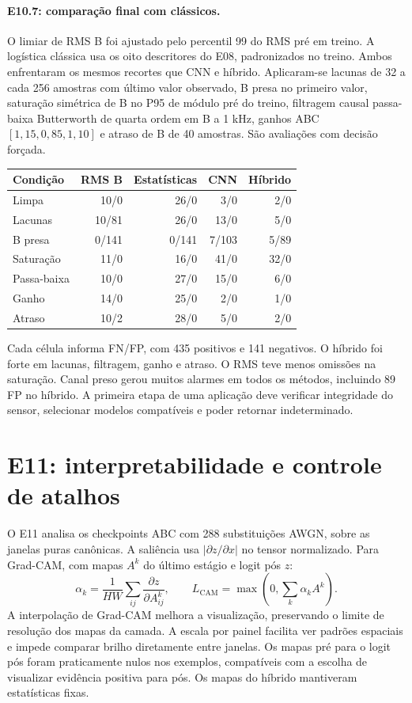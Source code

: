\documentclass[11pt,a4paper]{article}
\begin{document}
\paragraph{E10.7: comparação final com clássicos.} O limiar de RMS B foi ajustado pelo percentil 99 do RMS pré em treino. A logística clássica usa os oito descritores do E08, padronizados no treino. Ambos enfrentaram os mesmos recortes que CNN e híbrido. Aplicaram-se lacunas de 32 a cada 256 amostras com último valor observado, B presa no primeiro valor, saturação simétrica de B no P95 de módulo pré do treino, filtragem causal passa-baixa Butterworth de quarta ordem em B a 1 kHz, ganhos ABC $[1{,}15,0{,}85,1{,}10]$ e atraso de B de 40 amostras. São avaliações com decisão forçada.
\begin{center}
\begin{tabular}{@{}lrrrr@{}}\toprule
Condição & RMS B & Estatísticas & CNN & Híbrido\\\midrule
Limpa & 10/0 & 26/0 & 3/0 & 2/0\\
Lacunas & 10/81 & 26/0 & 13/0 & 5/0\\
B presa & 0/141 & 0/141 & 7/103 & 5/89\\
Saturação & 11/0 & 16/0 & 41/0 & 32/0\\
Passa-baixa & 10/0 & 27/0 & 15/0 & 6/0\\
Ganho & 14/0 & 25/0 & 2/0 & 1/0\\
Atraso & 10/2 & 28/0 & 5/0 & 2/0\\\bottomrule
\end{tabular}
\end{center}
Cada célula informa FN/FP, com 435 positivos e 141 negativos. O híbrido foi forte em lacunas, filtragem, ganho e atraso. O RMS teve menos omissões na saturação. Canal preso gerou muitos alarmes em todos os métodos, incluindo 89 FP no híbrido. A primeira etapa de uma aplicação deve verificar integridade do sensor, selecionar modelos compatíveis e poder retornar indeterminado.

\section{E11: interpretabilidade e controle de atalhos}
O E11 analisa os checkpoints ABC com 288 substituições AWGN, sobre as janelas puras canônicas. A saliência usa $|\partial z/\partial x|$ no tensor normalizado. Para Grad-CAM, com mapas $A^k$ do último estágio e logit pós $z$:
\[
 \alpha_k=\frac{1}{HW}\sum_{ij}\frac{\partial z}{\partial A^k_{ij}},
 \qquad L_{\mathrm{CAM}}=\max\!\left(0,\sum_k\alpha_kA^k\right).
\]
A interpolação de Grad-CAM melhora a visualização, preservando o limite de resolução dos mapas da camada. A escala por painel facilita ver padrões espaciais e impede comparar brilho diretamente entre janelas. Os mapas pré para o logit pós foram praticamente nulos nos exemplos, compatíveis com a escolha de visualizar evidência positiva para pós. Os mapas do híbrido mantiveram estatísticas fixas.
\end{document}
